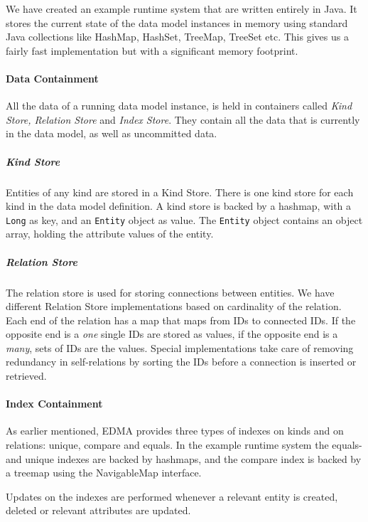 We have created an example runtime system that are written entirely
in Java. It stores the current state of the data model instances in
memory using standard Java collections like HashMap, HashSet, TreeMap,
TreeSet etc. This gives us a fairly fast implementation but with a
significant memory footprint.


\paragraph{Data Containment}

All the data of a running data model instance, is held in containers
called \emph{Kind Store, Relation Store} and \emph{Index Store}. They
contain all the data that is currently in the data model, as well
as uncommitted data.


\subparagraph{Kind Store}

Entities of any kind are stored in a Kind Store. There is one kind
store for each kind in the data model definition. A kind store is
backed by a hashmap, with a \texttt{Long} as key, and an \texttt{Entity}
object as value. The \texttt{Entity} object contains an object array,
holding the attribute values of the entity.


\subparagraph{Relation Store}

The relation store is used for storing connections between entities.
We have different Relation Store implementations based on cardinality
of the relation. Each end of the relation has a map that maps from
IDs to connected IDs. If the opposite end is a \emph{one} single IDs
are stored as values, if the opposite end is a \emph{many}, sets of
IDs are the values. Special implementations take care of removing
redundancy in self-relations by sorting the IDs before a connection
is inserted or retrieved. 


\paragraph{Index Containment}

As earlier mentioned, EDMA provides three types of indexes on kinds
and on relations: unique, compare and equals. In the example runtime
system the equals- and unique indexes are backed by hashmaps, and
the compare index is backed by a treemap using the NavigableMap interface.

Updates on the indexes are performed whenever a relevant entity is
created, deleted or relevant attributes are updated.


